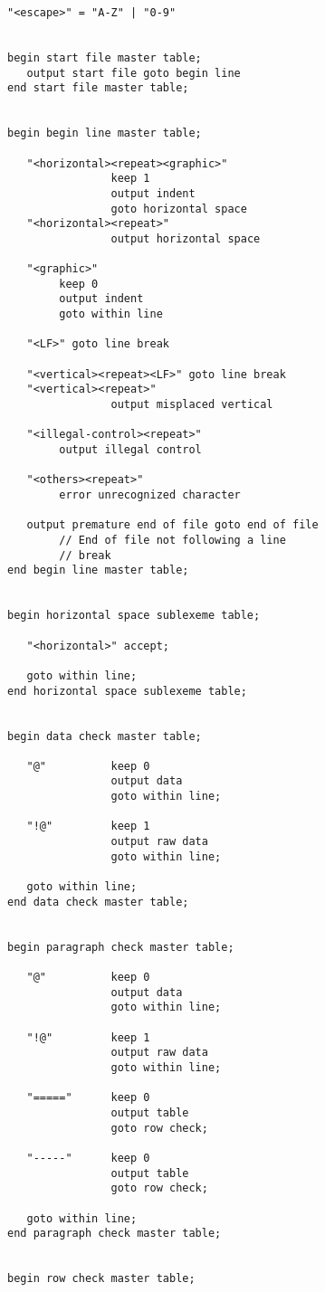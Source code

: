 \documentclass[12pt]{article}
\newenvironment{indpar}[1][0.3in]%
	{\begin{list}{}%
		     {\setlength{\itemsep}{0in}%
		      \setlength{\topsep}{0in}%
		      \setlength{\parsep}{1ex}%
		      \setlength{\labelwidth}{#1}%
		      \setlength{\leftmargin}{#1}%
		      \addtolength{\leftmargin}{\labelsep}}%
	 \item}%
	{\end{list}}
\begin{document}
\begin{indpar}
\begin{verbatim}
"<escape>" = "A-Z" | "0-9"


begin start file master table;
   output start file goto begin line
end start file master table;


begin begin line master table;

   "<horizontal><repeat><graphic>"
                keep 1
                output indent
                goto horizontal space
   "<horizontal><repeat>"
                output horizontal space

   "<graphic>"
        keep 0
        output indent
        goto within line

   "<LF>" goto line break

   "<vertical><repeat><LF>" goto line break
   "<vertical><repeat>"
                output misplaced vertical

   "<illegal-control><repeat>"
        output illegal control

   "<others><repeat>"
        error unrecognized character

   output premature end of file goto end of file
        // End of file not following a line
        // break
end begin line master table;


begin horizontal space sublexeme table;

   "<horizontal>" accept;

   goto within line;
end horizontal space sublexeme table;


begin data check master table;

   "@"          keep 0
                output data
                goto within line;

   "!@"         keep 1
                output raw data
                goto within line;

   goto within line;
end data check master table;


begin paragraph check master table;

   "@"          keep 0
                output data
                goto within line;

   "!@"         keep 1
                output raw data
                goto within line;

   "====="      keep 0
                output table
                goto row check;

   "-----"      keep 0
                output table
                goto row check;

   goto within line;
end paragraph check master table;


begin row check master table;


\end{verbatim}
\end{indpar}
\end{document}
